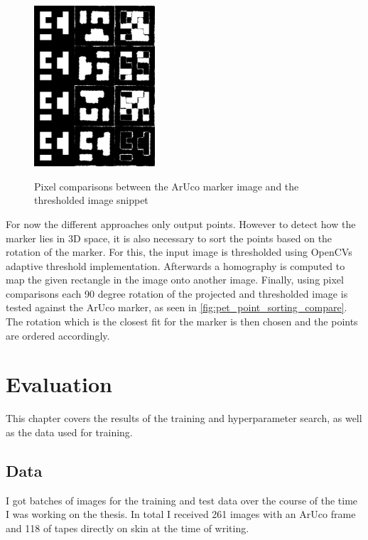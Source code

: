 \documentclass[10pt]{book}
\begin{document}
\begin{figure}
  \caption{Pixel comparisons between the \ac{ArUco} marker image and the thresholded image snippet}
  \includegraphics[width=0.4\textwidth]{image/pet_point_sorting_compare}
  \label{fig:pet_point_sorting_compare}
\end{figure}

For now the different approaches only output points. However to detect how the marker lies in 3D space, it is also necessary to sort the points based on the rotation of the marker. For this, the input image is thresholded using \acp{OpenCV} adaptive threshold implementation. Afterwards a homography is computed to map the given rectangle in the image onto another image. Finally, using pixel comparisons each 90 degree rotation of the projected and thresholded image is tested against the \ac{ArUco} marker, as seen in \autoref{fig:pet_point_sorting_compare}. The rotation which is the closest fit for the marker is then chosen and the points are ordered accordingly.

\chapter{Evaluation}
\label{chap:eval}

This chapter covers the results of the training and hyperparameter search, as well as the data used for training.

\section{Data}

I got batches of images for the training and test data over the course of the time I was working on the thesis. In total I received 261 images with an \ac{ArUco} frame and 118 of tapes directly on skin at the time of writing. 
\end{document}
